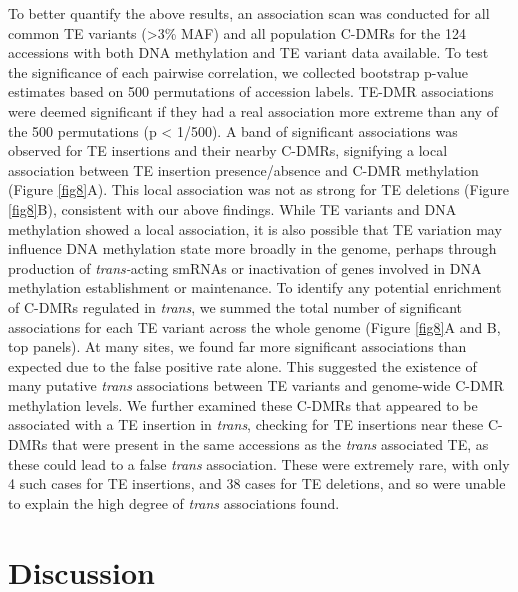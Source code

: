 \documentclass[12pt]{article}
\begin{document}
To better quantify the above results, an association scan was conducted
for all common TE variants (\textgreater{}3\% MAF) and all population
C-DMRs for the 124 accessions with both DNA methylation and TE variant
data available. To test the significance of each pairwise correlation,
we collected bootstrap p-value estimates based on 500 permutations of
accession labels. TE-DMR associations were deemed significant if they
had a real association more extreme than any of the 500 permutations (p
\textless{} 1/500). A band of significant associations was observed for
TE insertions and their nearby C-DMRs, signifying a local association
between TE insertion presence/absence and C-DMR methylation (Figure \ref{fig8}A).
This local association was not as strong for TE deletions (Figure \ref{fig8}B),
consistent with our above findings. While TE variants and DNA
methylation showed a local association, it is also possible that TE
variation may influence DNA methylation state more broadly in the
genome, perhaps through production of \emph{trans-}acting smRNAs or
inactivation of genes involved in DNA methylation establishment or
maintenance. To identify any potential enrichment of C-DMRs regulated in
\emph{trans}, we summed the total number of significant associations for
each TE variant across the whole genome (Figure \ref{fig8}A and B, top panels).
At many sites, we found far more significant associations than expected
due to the false positive rate alone. This suggested the existence of
many putative \emph{trans }associations between TE variants and
genome-wide C-DMR methylation levels. We further examined these C-DMRs
that appeared to be associated with a TE insertion in \emph{trans},
checking for TE insertions near these C-DMRs that were present in the
same accessions as the \emph{trans }associated TE, as these could lead
to a false \emph{trans }association. These were extremely rare, with
only 4 such cases for TE insertions, and 38 cases for TE deletions, and
so were unable to explain the high degree of \emph{trans }associations
found.

\section{Discussion}
\end{document}
